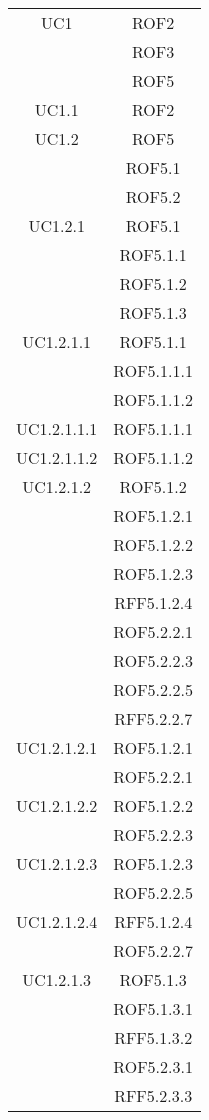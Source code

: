 \begin{longtable}{|c|c|}
\midrule
UC1
& ROF2\\
& ROF3\\
& ROF5\\

\midrule
UC1.1
& ROF2\\

\midrule
UC1.2
& ROF5\\
& ROF5.1\\
& ROF5.2\\

\midrule
UC1.2.1
& ROF5.1\\
& ROF5.1.1\\
& ROF5.1.2\\
& ROF5.1.3\\

\midrule
UC1.2.1.1
& ROF5.1.1\\
& ROF5.1.1.1\\
& ROF5.1.1.2\\

\midrule
UC1.2.1.1.1
& ROF5.1.1.1\\

\midrule
UC1.2.1.1.2
& ROF5.1.1.2\\

\midrule
UC1.2.1.2
& ROF5.1.2\\
& ROF5.1.2.1\\
& ROF5.1.2.2\\
& ROF5.1.2.3\\
& RFF5.1.2.4\\
& ROF5.2.2.1\\
& ROF5.2.2.3\\
& ROF5.2.2.5\\
& RFF5.2.2.7\\

\midrule
UC1.2.1.2.1
& ROF5.1.2.1\\
& ROF5.2.2.1\\

\midrule
UC1.2.1.2.2
& ROF5.1.2.2\\
& ROF5.2.2.3\\

\midrule
UC1.2.1.2.3
& ROF5.1.2.3\\
& ROF5.2.2.5\\

\midrule
UC1.2.1.2.4
& RFF5.1.2.4\\
& ROF5.2.2.7\\

\midrule
UC1.2.1.3
& ROF5.1.3\\
& ROF5.1.3.1\\
& RFF5.1.3.2\\
& ROF5.2.3.1\\
& RFF5.2.3.3\\


\end{longtable}
